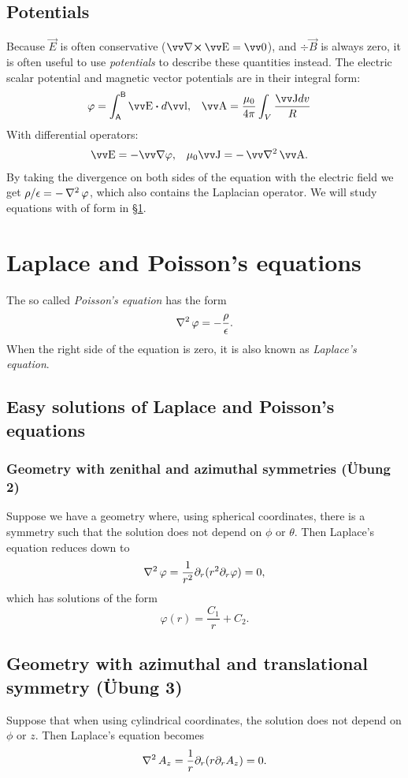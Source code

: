 \documentclass[margin=normal]{tex/hsrzf}
\theoremstyle{elmagzf}
\begin{document}
\subsection{Potentials}

Because \(\vec{E}\) is often conservative (\(\curl \vec{E} = \vec{0}\)), and
\(\div \vec{B}\) is always zero, it is often useful to use \emph{potentials} to
describe these quantities instead. The electric scalar potential and magnetic
vector potentials are in their integral form:
\begin{align*}
  \varphi &= \int_\mathsf{A}^\mathsf{B} \vec{E} \dotp d\vec{l}, &
  \vec{A} &= \frac{\mu_0}{4\pi} \int_V \frac{\vec{J} dv}{R}
\end{align*}
With differential operators:
\begin{align*}
  \vec{E} &= - \grad \varphi, &
  \mu_0 \vec{J} &= - \vlaplacian \vec{A}.
\end{align*}
By taking the divergence on both sides of the equation with the electric field
we get \(\rho/\epsilon = - \operatorname{\nabla^2} \varphi\), which also contains the
Laplacian operator. We will study equations with of form in \S \ref{sec:poisson}.


\section{Laplace and Poisson's equations} \label{sec:poisson}

The so called \emph{Poisson's equation} has the form
\[
  \operatorname{\nabla^2} \varphi = - \frac{\rho}{\epsilon}.
\]
When the right side of the equation is zero, it is also known as \emph{Laplace's
equation}.

\subsection{Easy solutions of Laplace and Poisson's equations}

\subsubsection{Geometry with zenithal and azimuthal symmetries (\"Ubung 2)}

Suppose we have a geometry where, using spherical coordinates, there is a
symmetry such that the solution does not depend on \(\phi\) or \(\theta\).
Then Laplace's equation reduces down to
\[
  \operatorname{\nabla^2} \varphi = \frac{1}{r^2} \partial_r ( r^2 \partial_r \varphi) = 0,
\]
which has solutions of the form
\[
  \varphi(r) = \frac{C_1}{r} + C_2.
\]

\subsection{Geometry with azimuthal and translational symmetry (\"Ubung 3)}

Suppose that when using cylindrical coordinates, the solution does not depend
on \(\phi\) or \(z\). Then Laplace's equation becomes
\[
  \operatorname{\nabla^2} A_z = \frac{1}{r} \partial_r (r \partial_r A_z) = 0.
\]
\end{document}
